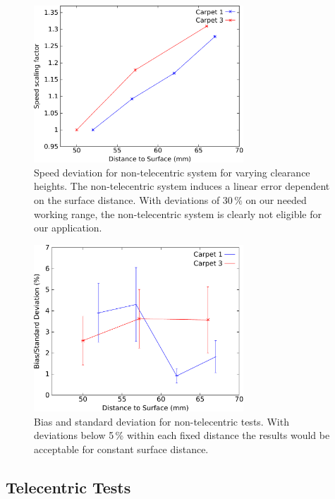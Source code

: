 \documentclass[12pt,a4paper]{article}
\begin{document}
\begin{figure}[htbp]
\begin{center}
\includegraphics[width=0.7\textwidth]{figures/ntele-scale.pdf}
\caption{\label{fig:ntele-scale}
Speed deviation for non-telecentric system for varying clearance heights. The non-telecentric system induces a linear error dependent on the surface distance. 
With deviations of 30\,\% on our needed working range, the non-telecentric system is clearly not eligible for our application.
}
\end{center}
\end{figure}


\begin{figure}[htbp]
\begin{center}
\includegraphics[width=0.7\textwidth]{figures/ntele-bias.pdf}
\caption{\label{fig:ntele-bias}
Bias and standard deviation for non-telecentric tests. 
With deviations below 5\,\% within each fixed distance the results would be acceptable for constant surface distance.
}
\end{center}
\end{figure}

\subsection{Telecentric Tests}
\end{document}
